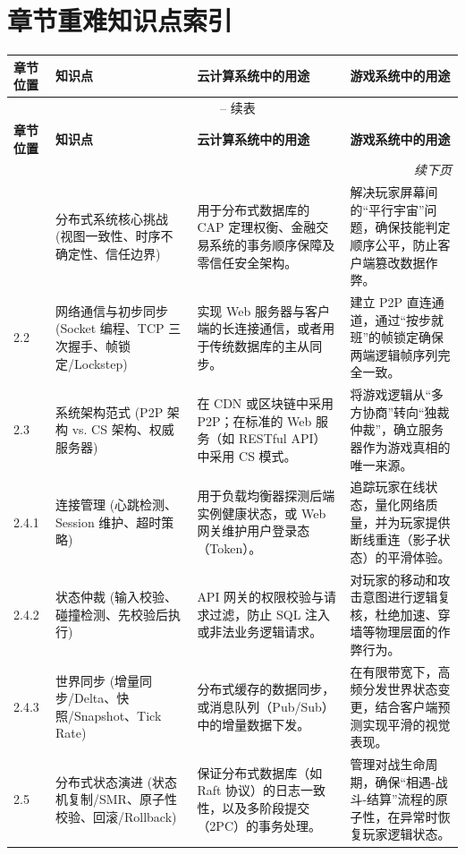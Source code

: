 \section{章节重难知识点索引}

\begin{longtable}{p{2.5cm}p{3cm}p{4.5cm}p{4.5cm}}
\hline
\textbf{章节位置} & \textbf{知识点} & \textbf{云计算系统中的用途} & \textbf{游戏系统中的用途} \\
\hline
\endfirsthead
\multicolumn{4}{c}{\tablename\ \thetable{} -- 续表} \\
\hline
\textbf{章节位置} & \textbf{知识点} & \textbf{云计算系统中的用途} & \textbf{游戏系统中的用途} \\
\hline
\endhead
\hline
\multicolumn{4}{r}{\textit{续下页}} \\
\endfoot
\hline
\endlastfoot
2.1 & 分布式系统核心挑战 (视图一致性、时序不确定性、信任边界) & 用于分布式数据库的 CAP 定理权衡、金融交易系统的事务顺序保障及零信任安全架构。 & 解决玩家屏幕间的“平行宇宙”问题，确保技能判定顺序公平，防止客户端篡改数据作弊。 \\
\hline
2.2 & 网络通信与初步同步 (Socket 编程、TCP 三次握手、帧锁定/Lockstep) & 实现 Web 服务器与客户端的长连接通信，或者用于传统数据库的主从同步。 & 建立 P2P 直连通道，通过“按步就班”的帧锁定确保两端逻辑帧序列完全一致。 \\
\hline
2.3 & 系统架构范式 (P2P 架构 vs. CS 架构、权威服务器) & 在 CDN 或区块链中采用 P2P；在标准的 Web 服务（如 RESTful API）中采用 CS 模式。 & 将游戏逻辑从“多方协商”转向“独裁仲裁”，确立服务器作为游戏真相的唯一来源。 \\
\hline
2.4.1 & 连接管理 (心跳检测、Session 维护、超时策略) & 用于负载均衡器探测后端实例健康状态，或 Web 网关维护用户登录态（Token）。 & 追踪玩家在线状态，量化网络质量，并为玩家提供断线重连（影子状态）的平滑体验。 \\
\hline
2.4.2 & 状态仲裁 (输入校验、碰撞检测、先校验后执行) & API 网关的权限校验与请求过滤，防止 SQL 注入或非法业务逻辑请求。 & 对玩家的移动和攻击意图进行逻辑复核，杜绝加速、穿墙等物理层面的作弊行为。 \\
\hline
2.4.3 & 世界同步 (增量同步/Delta、快照/Snapshot、Tick Rate) & 分布式缓存的数据同步，或消息队列（Pub/Sub）中的增量数据下发。 & 在有限带宽下，高频分发世界状态变更，结合客户端预测实现平滑的视觉表现。 \\
\hline
2.5 & 分布式状态演进 (状态机复制/SMR、原子性校验、回滚/Rollback) & 保证分布式数据库（如 Raft 协议）的日志一致性，以及多阶段提交（2PC）的事务处理。 & 管理对战生命周期，确保“相遇-战斗-结算”流程的原子性，在异常时恢复玩家逻辑状态。 \\

\end{longtable}

